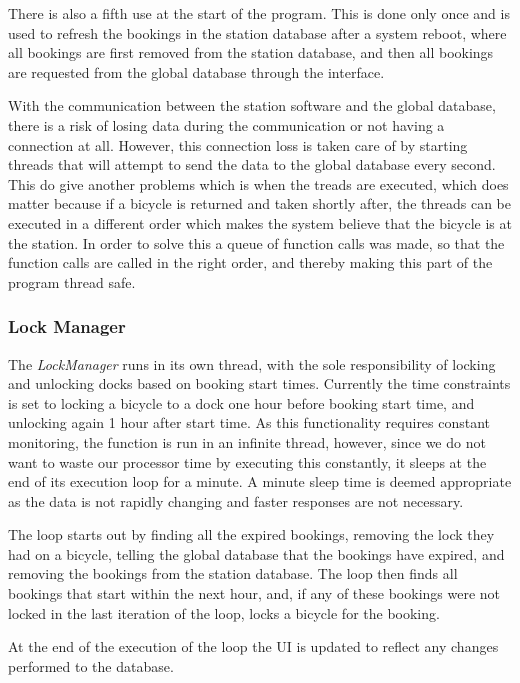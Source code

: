 There is also a fifth use at the start of the program.
This is done only once and is used to refresh the bookings in the station database after a system reboot, where all bookings are first removed from the station database, and then all bookings are requested from the global database through the interface.

With the communication between the station software and the global database, there is a risk of losing data during the communication or not having a connection at all.
However, this connection loss is taken care of by starting threads that will attempt to send the data to the global database every second.
This do give another problems which is when the treads are executed, which does matter because if a bicycle is returned and taken shortly after, the threads can be executed in a different order which makes the system believe that the bicycle is at the station. 
In order to solve this a queue of function calls was made, so that the function calls are called in the right order, and thereby making this part of the program thread safe.

\subsubsection{Lock Manager}
The \textit{LockManager} runs in its own thread, with the sole responsibility of locking and unlocking docks based on booking start times. 
Currently the time constraints is set to locking a bicycle to a dock one hour before booking start time, and unlocking again 1 hour after start time. 
As this functionality requires constant monitoring, the function is run in an infinite thread, however, since we do not want to waste our processor time by executing this constantly, it sleeps at the end of its execution loop for a minute. 
A minute sleep time is deemed appropriate as the data is not rapidly changing and faster responses are not necessary.

The loop starts out by finding all the expired bookings, removing the lock they had on a bicycle, telling the global database that the bookings have expired, and removing the bookings from the station database.
The loop then finds all bookings that start within the next hour, and, if any of these bookings were not locked in the last iteration of the loop, locks a bicycle for the booking.

At the end of the execution of the loop the UI is updated to reflect any changes performed to the database.


